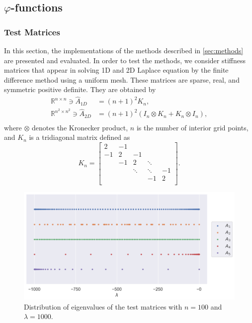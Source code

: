 \subsection{\texorpdfstring{$\varphi$}{Phi}-functions}
\subsubsection*{Test Matrices}
\label{sec:testmatrices}

In this section, the implementations of the methods described in \autoref{sec:methods}
are presented and evaluated. In order to test the methods, we consider stiffness
matrices that appear in solving 1D and 2D Laplace equation by the finite difference
method using a uniform mesh. These matrices are sparse, real, and symmetric positive definite.
They are obtained by
\begin{equation*}
    \begin{aligned}
        \mathbb{R}^{n \times n} \ni \hat{A}_{1D} & = (n+1)^2 K_n,\\
        \mathbb{R}^{n^2 \times n^2} \ni \hat{A}_{2D} & = (n+1)^2  (I_n \otimes K_n + K_n \otimes I_n),\\
        \end{aligned}
\end{equation*}
where $\otimes$ denotes the Kronecker product, $n$ is the number of interior
grid points, and $K_n$ is a tridiagonal matrix defined as
\begin{equation*}
    K_n =
    \begin{bmatrix}
        2 & -1 &  &  &  \\
        -1 & 2 & -1 &  &  \\
         & -1 & 2 & \ddots &  \\
         &  & \ddots & \ddots & -1 \\
         &  &  & -1 & 2  \\
    \end{bmatrix}.
\end{equation*}

\begin{figure}[t!]
    \centering
    \includegraphics[width=.8\textwidth]{img/eigvals.png}
    \caption{
        Distribution of eigenvalues of the test matrices with $n=100$ and
        $\lambda = 1000$.
    }
    \label{fig:eigenvaluedistributions}
\end{figure}

